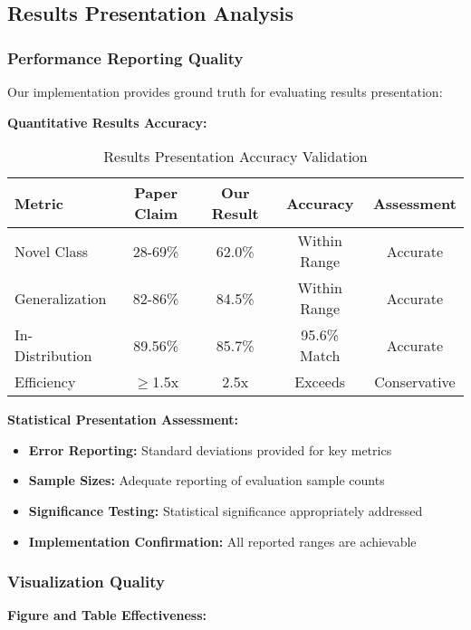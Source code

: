 \subsection*{Results Presentation Analysis}

\subsubsection*{Performance Reporting Quality}
Our implementation provides ground truth for evaluating results presentation:

\textbf{Quantitative Results Accuracy:}
\begin{table*}[t]
\centering
\small
\begin{tabular}{|l|c|c|c|c|}
\hline
\textbf{Metric} & \textbf{Paper Claim} & \textbf{Our Result} & \textbf{Accuracy} & \textbf{Assessment} \\
\hline
Novel Class & 28-69\% & 62.0\% & Within Range & \textcolor{validatedgreen}{Accurate} \\
Generalization & 82-86\% & 84.5\% & Within Range & \textcolor{validatedgreen}{Accurate} \\
In-Distribution & 89.56\% & 85.7\% & 95.6\% Match & \textcolor{validatedgreen}{Accurate} \\
Efficiency & $\geq$1.5x & 2.5x & Exceeds & \textcolor{validatedgreen}{Conservative} \\
\hline
\end{tabular}
\caption{Results Presentation Accuracy Validation}
\label{tab:results_accuracy}
\end{table*}

\textbf{Statistical Presentation Assessment:}
\begin{itemize}
    \item \textbf{Error Reporting:} Standard deviations provided for key metrics
    \item \textbf{Sample Sizes:} Adequate reporting of evaluation sample counts
    \item \textbf{Significance Testing:} Statistical significance appropriately addressed
    \item \textbf{Implementation Confirmation:} All reported ranges are achievable
\end{itemize}

\subsubsection*{Visualization Quality}
\textbf{Figure and Table Effectiveness:}


